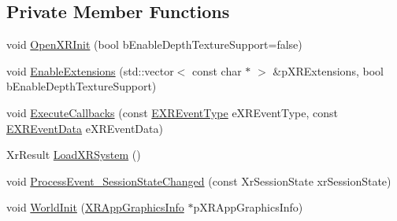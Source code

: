 \subsection*{Private Member Functions}
\begin{DoxyCompactItemize}
\item 
void \mbox{\hyperlink{class_open_x_r_provider_1_1_x_r_provider_a0d19487d4508a89e3554a9fa328b4a05}{Open\+X\+R\+Init}} (bool b\+Enable\+Depth\+Texture\+Support=false)
\item 
void \mbox{\hyperlink{class_open_x_r_provider_1_1_x_r_provider_a58c1f88d3c9f28e99ac784767089357c}{Enable\+Extensions}} (std\+::vector$<$ const char $\ast$ $>$ \&p\+X\+R\+Extensions, bool b\+Enable\+Depth\+Texture\+Support)
\item 
void \mbox{\hyperlink{class_open_x_r_provider_1_1_x_r_provider_a12702a0d244674e54443ccf5053a3efb}{Execute\+Callbacks}} (const \mbox{\hyperlink{namespace_open_x_r_provider_aa80d286c249d35071f2ff4d19d9dc4c3}{E\+X\+R\+Event\+Type}} e\+X\+R\+Event\+Type, const \mbox{\hyperlink{namespace_open_x_r_provider_a45de367abcea927b192e21d1c8b9853d}{E\+X\+R\+Event\+Data}} e\+X\+R\+Event\+Data)
\item 
Xr\+Result \mbox{\hyperlink{class_open_x_r_provider_1_1_x_r_provider_a1bd2735b39ea943cd9e436bb0650bc43}{Load\+X\+R\+System}} ()
\item 
void \mbox{\hyperlink{class_open_x_r_provider_1_1_x_r_provider_ad8bb9f4fcd7a16440f89d3ad0b54b17b}{Process\+Event\+\_\+\+Session\+State\+Changed}} (const Xr\+Session\+State xr\+Session\+State)
\item 
void \mbox{\hyperlink{class_open_x_r_provider_1_1_x_r_provider_a381bae7b1021638036878cad1c0ea3c2}{World\+Init}} (\mbox{\hyperlink{struct_open_x_r_provider_1_1_x_r_app_graphics_info}{X\+R\+App\+Graphics\+Info}} $\ast$p\+X\+R\+App\+Graphics\+Info)
\end{DoxyCompactItemize}

